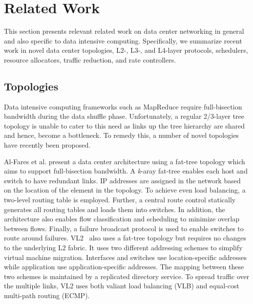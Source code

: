 \documentclass[a4paper,12pt,twoside,openright]{report}
\begin{document}
\chapter{Related Work}\label{chapter:relatedWork}
This section presents relevant related work on data center networking in general
and also specific to data intensive computing. Specifically, we summarize recent
work in novel data center topologies, L2-, L3-, and L4-layer protocols,
schedulers, resource allocators, traffic reduction, and rate controllers. 

\section{Topologies}
Data intensive computing frameworks such as MapReduce require full-bisection
bandwidth during the data shuffle phase. Unfortunately, a regular 2/3-layer tree
topology is unable to cater to this need as links up the tree hierarchy are
shared and hence, become a bottleneck. To remedy this, a number of novel
topologies have recently been proposed.

Al-Fares et al.\cite{Al-Fares:2008:SCD} present a data center architecture using
a fat-tree topology which aims to support full-bisection bandwidth. A
\emph{k}-aray fat-tree enables each host and switch to have redundant links. IP
addresses are assigned in the network based on the location of the element in
the topology. To achieve even load balancing, a two-level routing table is
employed. Further, a central route control statically generates all routing
tables and loads them into switches. In addition, the architecture also enables
flow classification and scheduling to minimize overlap between flows. Finally, a
failure broadcast protocol is used to enable switches to route around failures.
VL2~\cite{Greenberg:2009:VSF} also uses a fat-tree topology but requires no
changes to the underlying L2 fabric. It uses two different addressing schemes to
simplify virtual machine migration. Interfaces and switches use
location-specific addresses while application use application-specific
addresses. The mapping between these two schemes is maintained by a replicated
directory service. To spread traffic over the multiple links, VL2 uses both
valiant load balancing (VLB) and equal-cost multi-path routing (ECMP).
\end{document}
